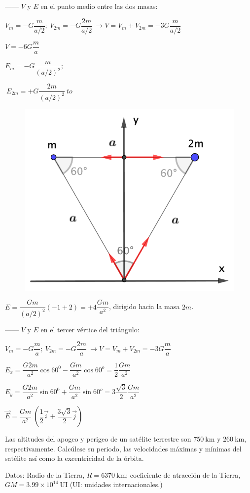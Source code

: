 \begin{multicols}{2}
------ $V$ y $E$ en el punto medio entre las dos masas:

$V_m=-G\dfrac{m}{a/2}; \ V_{2m}=-G\dfrac{2m}{a/2} \ \to V=V_m+V_{2m}=-3G\dfrac{m}{a/2}$

$V=-6G\dfrac m a$

$E_m=-G\dfrac{m}{(a/2)^2}; $

$\ E_{2m}=+G\dfrac{2m}{(a/2)^2} \ to $
\begin{figure}[H]
	\centering
	\includegraphics[width=.5\textwidth]{imagenes/imagenes15/T15IM06.png}
\end{figure}	
\end{multicols}
$E=\dfrac{Gm}{(a/2)^2}(-1+2)=+4\dfrac{Gm}{a^2}$, dirigido hacia la masa $2m$.

------ $V$ y $E$ en el tercer vértice del triángulo:

$V_m=-G\dfrac m a ;\ V_{2m}=-G \dfrac {2m} a \ \to V=V_m+V_{2m}=-3G\dfrac m a$

$E_x=\dfrac{G2m}{a^2} \cos 60^0 - \dfrac{Gm}{a^2} \cos 60^o = \dfrac 1 2 \dfrac{Gm}{a^2}$

$E_y=\dfrac{G2m}{a^2} \sin 60^0 + \dfrac{Gm}{a^2} \sin 60^o = 3 \dfrac{\sqrt{3}}2 \dfrac{Gm}{a^2}$

$\vec E=\dfrac{Gm}{a^2}\ \left( \dfrac 1 2 \vec i + \dfrac{3\sqrt{3}}2 \vec j \right)$


\vspace{15mm} %
\begin{prob}
	Las altitudes del apogeo y perigeo de un satélite terrestre son $750\ \mathrm{km}$ y $260\ \mathrm{km}$, respectivamente. Calcúlese su periodo, las velocidades máximas y mínimas del satélite así como la excentricidad de la órbita.
	
	Datos: Radio de la Tierra, $R=6370\ \mathrm{km}$; coeficiente de atracción de la Tierra, $GM=3.99\times 10^{14}\ \mathrm{UI}$ (\textcolor{gris}{UI: unidades internacionales.})
\end{prob}
 
